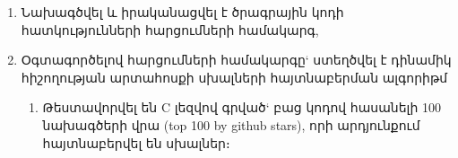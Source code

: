 {
	\begin{enumerate}
		\item
		Նախագծվել և իրականացվել է ծրագրային կոդի հատկությունների հարցումների համակարգ,

		\item
		Օգտագործելով հարցումների համակարգը` ստեղծվել է դինամիկ հիշողության արտահոսքի սխալների հայտնաբերման ալգորիթմ

        {
			\begin{enumerate}
				\item
				Թեստավորվել են C լեզվով գրված` բաց կոդով հասանելի 100 նախագծերի վրա (top 100 by github stars), որի արդյունքում հայտնաբերվել են սխալներ։
			\end{enumerate}
		}

	\end{enumerate}
}
